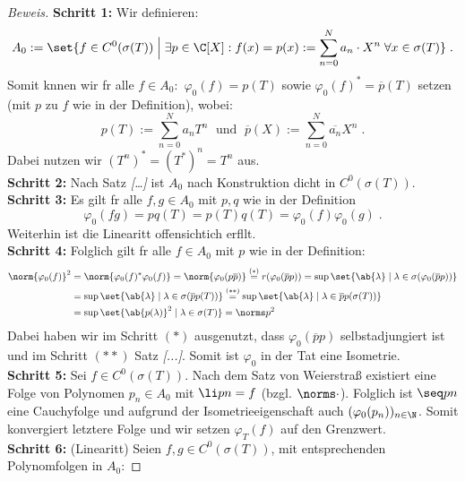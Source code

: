 \begin{proof}[Beweis]
	\textbf{Schritt 1:} Wir definieren:
	\[A_0 := \set{f \in C^0(\sigma(T)) \;\Big\vert\; \exists p \in \C[X]: f(x) = p(x):= \sum_{n=0}^N a_n \cdot X^n \;\forall x \in \sigma(T) }\;.\]
	Somit k\os nnen wir f\us r alle  \(f \in A_0:\) \(\varphi_0 (f) = p(T)\) sowie \(\varphi_0(f)^* = \overline{p}(T)\) setzen (mit $p$ zu $f$ wie in der Definition), wobei:
	\[p(T) := \sum_{n=0}^N a_n T^n\; \text{ und }\;\overline{p}(X) := \sum_{n=0}^N \overline{a_n}X^n \;.\]
	Dabei nutzen wir \((T^n)^* = (T^*)^n = T^n\) aus.\\
	\textbf{Schritt 2:} Nach Satz \textit{[\ldots]} ist $A_0$ nach Konstruktion dicht in \(C^0(\sigma(T))\).\\
	\textbf{Schritt 3:} Es gilt f\us r alle \(f, g \in A_0\) mit $p, q$ wie in der Definition
	\[ \varphi_0(fg) = pq(T) =  p(T) q(T) = \varphi_0(f)\varphi_0(g)\;.\]
	Weiterhin ist die Linearit\as t offensichtich erf\us llt. \\
	\textbf{Schritt 4:} Folglich gilt f\us r alle $f \in A_0$ mit $p$ wie in der Definition:
	\begin{align*}
	\norm{\varphi_0(f)}^2 &= \norm{\varphi_0(f)^* \varphi_0(f)} = \norm{\varphi_0(p \overline{p})} \overset{(*)}{=} r(\varphi_0(\overline p p )) = \sup\set{\ab{\lambda} \;\vert\; \lambda \in \sigma(\varphi_0(\overline p p ))} \\
	&  = \sup\set{\ab{\lambda} \;\vert\; \lambda \in \sigma(\overline p p (T))} \overset{(**)}{=} \sup\set{\ab{\lambda} \;\vert\; \lambda \in \overline p p (\sigma(T))}\\& = \sup\set{\ab{p(\lambda)}^2 \;\vert\; \lambda \in \sigma(T)}  = \norms p ^2
	\end{align*}
	Dabei haben wir im Schritt \((*)\) ausgenutzt, dass \(\varphi_0(\overline p p )\) selbstadjungiert ist und im Schritt \((**)\) Satz \textit{[...]}. Somit ist $\varphi_0$ in der Tat eine Isometrie. \\
	\textbf{Schritt 5:} Sei \(f\in C^0(\sigma(T))\). Nach dem Satz von Weierstra\ss{} existiert eine Folge von Polynomen \(p_n \in A_0\) mit \(\li pn = f\) (bzgl. \(\norms\cdot\)). Folglich ist \(\seq pn \) eine Cauchyfolge und aufgrund der Isometrieeigenschaft auch \((\varphi_0(p_n))_{n\in\N}\). Somit konvergiert letztere Folge und wir setzen \(\varphi_T(f)\) auf den Grenzwert.\\
	\textbf{Schritt 6:} (Linearit\as t) Seien \(f,g \in C^0(\sigma(T))\), mit entsprechenden Polynomfolgen in $A_0$: 

\end{proof}
